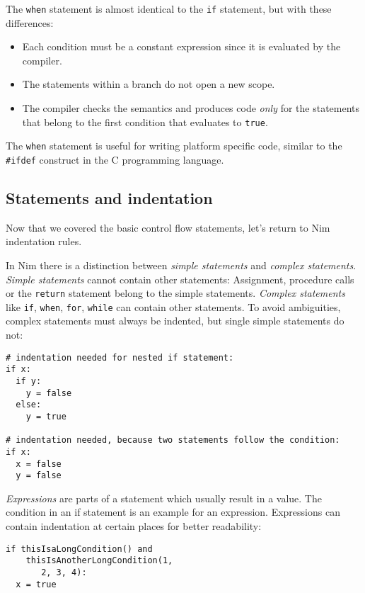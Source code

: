 The \texttt{when} statement is almost identical to the \texttt{if}
statement, but with these differences:

\begin{itemize}
\tightlist
\item
  Each condition must be a constant expression since it is evaluated by
  the compiler.
\item
  The statements within a branch do not open a new scope.
\item
  The compiler checks the semantics and produces code \emph{only} for
  the statements that belong to the first condition that evaluates to
  \texttt{true}.
\end{itemize}

The \texttt{when} statement is useful for writing platform specific
code, similar to the \texttt{\#ifdef} construct in the C programming
language.

\hypertarget{statements-and-indentation}{%
\subsection{Statements and
indentation}\label{statements-and-indentation}}

Now that we covered the basic control flow statements, let's return to
Nim indentation rules.

In Nim there is a distinction between \emph{simple statements} and
\emph{complex statements}. \emph{Simple statements} cannot contain other
statements: Assignment, procedure calls or the \texttt{return} statement
belong to the simple statements. \emph{Complex statements} like
\texttt{if}, \texttt{when}, \texttt{for}, \texttt{while} can contain
other statements. To avoid ambiguities, complex statements must always
be indented, but single simple statements do not:

\begin{verbatim}
# indentation needed for nested if statement:
if x:
  if y:
    y = false
  else:
    y = true

# indentation needed, because two statements follow the condition:
if x:
  x = false
  y = false
\end{verbatim}

\emph{Expressions} are parts of a statement which usually result in a
value. The condition in an if statement is an example for an expression.
Expressions can contain indentation at certain places for better
readability:

\begin{verbatim}
if thisIsaLongCondition() and
    thisIsAnotherLongCondition(1,
       2, 3, 4):
  x = true
\end{verbatim}

